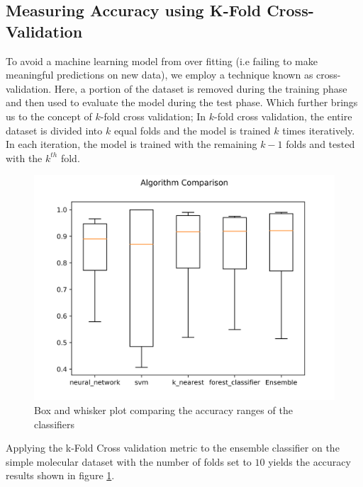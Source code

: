 \documentclass[a4paper,12pt]{report}
\begin{document}
		\subsection{Measuring Accuracy using K-Fold Cross-Validation}
		To avoid a machine learning model from over fitting (i.e failing to make meaningful predictions on new data), we employ a technique known as cross-validation. Here, a portion of the dataset is removed during the training phase and then used to evaluate the model during the test phase. Which further brings us to the concept of $k$-fold cross validation; In $k$-fold cross validation, the entire dataset is divided into $k$ equal folds and the model is trained $k$ times iteratively. In each iteration, the model is trained with the remaining $k-1$ folds and tested with the $k^{th}$ fold.
			\begin{figure}[H]
				\centering
				\includegraphics[width=\textwidth,scale=1]{images/model_comparison}
				\caption{Box and whisker plot comparing the accuracy ranges of the classifiers}
				\label{fig:box_plot_comparison}
			\end{figure}
		Applying the k-Fold Cross validation metric to the ensemble classifier on the simple molecular dataset with the number of folds set to $10$ yields the accuracy results shown in figure \ref{fig:box_plot_comparison}.
		
\end{document}
